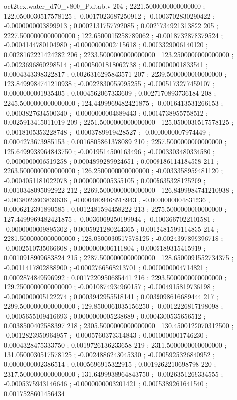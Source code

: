 \begin{filecontents}[overwrite]{oct2tex.water_d70_v800_P.dtab.v}
204 ; 2221.5000000000000000 ; 122.0500030517578125 ; -0.0017023687250912 ; -0.0003702830290422 ; -0.0000000003899913 ; 0.0002131757792085 ; 0.0027734921313822
205 ; 2227.5000000000000000 ; 122.6500015258789062 ; -0.0018732878379524 ; -0.0004144780104980 ; -0.0000000002415618 ; 0.0003329006140120 ; 0.0028162221424282
206 ; 2233.5000000000000000 ; 123.2500000000000000 ; -0.0023696860298514 ; -0.0005001818062738 ; 0.0000000001833541 ; 0.0004343398322817 ; 0.0026316295843571
207 ; 2239.5000000000000000 ; 123.8499984741210938 ; -0.0022830055095255 ; -0.0005173277459107 ; 0.0000000001935405 ; 0.0004562067333609 ; 0.0027170893736184
208 ; 2245.5000000000000000 ; 124.4499969482421875 ; -0.0016413531266153 ; -0.0003827634500340 ; -0.0000000004889443 ; 0.0004738955758512 ; 0.0025913415011019
209 ; 2251.5000000000000000 ; 125.0500030517578125 ; -0.0018105353228748 ; -0.0003789919428527 ; -0.0000000007974449 ; 0.0004273673985153 ; 0.0016805861378089
210 ; 2257.5000000000000000 ; 125.6499938964843750 ; -0.0019514500163496 ; -0.0003303480334580 ; -0.0000000006519258 ; 0.0004899289924651 ; 0.0009186114184558
211 ; 2263.5000000000000000 ; 126.2500000000000000 ; -0.0033358959481120 ; -0.0004051181022078 ; 0.0000000005355105 ; 0.0005635328125209 ; 0.0010348095092922
212 ; 2269.5000000000000000 ; 126.8499984741210938 ; -0.0038022603839636 ; -0.0004809468518943 ; -0.0000000004831236 ; 0.0006212391890585 ; 0.0012481594458222
213 ; 2275.5000000000000000 ; 127.4499969482421875 ; -0.0036069250199944 ; -0.0003667022101581 ; -0.0000000009895302 ; 0.0005921280244365 ; 0.0012481599114835
214 ; 2281.5000000000000000 ; 128.0500030517578125 ; -0.0024397899396718 ; -0.0002510735066608 ; 0.0000000006111804 ; 0.0005189315415919 ; 0.0010918909683824
215 ; 2287.5000000000000000 ; 128.6500091552734375 ; -0.0011417802888900 ; -0.0002766568213701 ; 0.0000000004714821 ; 0.0002874849596992 ; 0.0017220950685441
216 ; 2293.5000000000000000 ; 129.2500000000000000 ; -0.0010874934960157 ; -0.0004915819736198 ; -0.0000000005122274 ; 0.0003942955518141 ; 0.0039098616689444
217 ; 2299.5000000000000000 ; 129.8500061035156250 ; -0.0012226817198098 ; -0.0005655109416693 ; 0.0000000005238689 ; 0.0004300535656512 ; 0.0038500402588397
218 ; 2305.5000000000000000 ; 130.4500122070312500 ; -0.0012823950964957 ; -0.0005760373314843 ; 0.0000000001746230 ; 0.0004328475333750 ; 0.0019726136233658
219 ; 2311.5000000000000000 ; 131.0500030517578125 ; -0.0024886243045330 ; -0.0005925326840952 ; 0.0000000002386514 ; 0.0005696915322915 ; 0.0019262210698798
220 ; 2317.5000000000000000 ; 131.6499938964843750 ; -0.0026351269334555 ; -0.0005375943146646 ; -0.0000000003201421 ; 0.0005389261641540 ; 0.0017528601456434

\end{filecontents}
